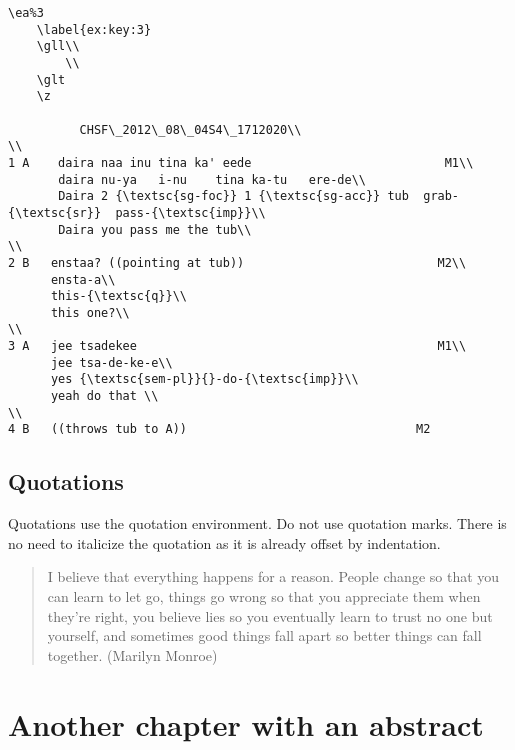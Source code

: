 \begin{lstlisting}
\ea%3
    \label{ex:key:3}
    \gll\\
        \\
    \glt
    \z

          CHSF\_2012\_08\_04S4\_1712020\\
\\
1 A    daira naa inu tina ka' eede                           M1\\
       daira nu-ya   i-nu    tina ka-tu   ere-de\\
       Daira 2 {\textsc{sg-foc}} 1 {\textsc{sg-acc}} tub  grab-{\textsc{sr}}  pass-{\textsc{imp}}\\
       Daira you pass me the tub\\
\\
2 B   enstaa? ((pointing at tub))                           M2\\
      ensta-a\\
      this-{\textsc{q}}\\
      this one?\\
\\
3 A   jee tsadekee                                          M1\\
      jee tsa-de-ke-e\\
      yes {\textsc{sem-pl}}{}-do-{\textsc{imp}}\\
      yeah do that \\
\\
4 B   ((throws tub to A))                                M2
\end{lstlisting}

\section{Quotations}

Quotations use the quotation environment. Do not use quotation marks. There is no need to italicize the quotation as it is already offset by indentation. 

\begin{quotation}
I believe that everything happens for a reason. People change so that you can learn to let go, things go wrong so that you appreciate them when they're right, you believe lies so you eventually learn to trust no one but yourself, and sometimes good things fall apart so better things can fall together. (Marilyn Monroe) \end{quotation}
\chapter{Another chapter with an abstract}

